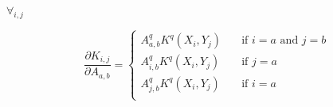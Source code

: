 \documentclass{article}
\begin{document}
$\forall_{i,j} $

$$
  \frac{\partial K_{i,j}}{\partial A_{a, b}} =
  \begin{cases}
    A_{a, b}^{q} K^{q}(X_i, Y_j) & \quad \text{if } i = a \text{ and } j = b\\
    A_{i, b}^{q} K^{q}(X_i, Y_j) & \quad \text{if } j = a\\
    A_{j, b}^{q} K^{q}(X_i, Y_j) & \quad \text{if } i = a\\
  \end{cases}
$$
\end{document}
